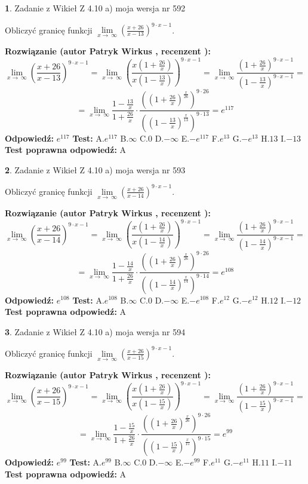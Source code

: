 \documentclass[12pt, a4paper]{article}
\theoremstyle{definition} %
\newtheorem{zad}{}
\newcommand{\zadStart}[1]{\begin{zad}#1\newline}
\newcommand{\zadStop}{\end{zad}}
\newcommand{\rozwStart}[2]{\noindent \textbf{Rozwiązanie (autor #1 , recenzent #2): }\newline}
\newcommand{\rozwStop}{\newline}
\newcommand{\odpStart}{\noindent \textbf{Odpowiedź:}\newline}
\newcommand{\odpStop}{\newline}
\newcommand{\testStart}{\noindent \textbf{Test:}\newline}
\newcommand{\testStop}{\newline}
\newcommand{\kluczStart}{\noindent \textbf{Test poprawna odpowiedź:}\newline}
\newcommand{\kluczStop}{\newline}
\begin{document}
\zadStart{Zadanie z Wikieł Z 4.10 a) moja wersja nr 592}

Obliczyć granicę funkcji  $\lim\limits_{x\to\ \infty}(\frac{x+26}{x-13})^{9\cdot x-1}$.
\zadStop
\rozwStart{Patryk Wirkus}{}
$$\lim\limits_{x\to\ \infty}(\frac{x+26}{x-13})^{9\cdot x-1} = \lim\limits_{x\to\ \infty}(\frac{x(1+\frac{26}{x})}{x(1-\frac{13}{x})})^{9\cdot x-1}=\lim\limits_{x\to\ \infty}\frac{(1+\frac{26}{x})^{9\cdot x-1}}{(1-\frac{13}{x})^{9\cdot x-1}}=$$
$$=\lim\limits_{x\to\ \infty}\frac{1-\frac{13}{x}}{1+\frac{26}{x}}\cdot\frac{((1+\frac{26}{x})^{\frac{x}{26}})^{9\cdot26}}{((1-\frac{13}{x})^{\frac{x}{13}})^{9\cdot13}}=e^{117}$$
\rozwStop
\odpStart
$e^{117}$
\odpStop
\testStart
A.$e^{117}$ B.$\infty$ C.$0$ D.$-\infty$ E.$-e^{117}$
F.$e^{13}$ G.$-e^{13}$
H.$13$
I.$-13$
\testStop
\kluczStart
A
\kluczStop



\zadStart{Zadanie z Wikieł Z 4.10 a) moja wersja nr 593}

Obliczyć granicę funkcji  $\lim\limits_{x\to\ \infty}(\frac{x+26}{x-14})^{9\cdot x-1}$.
\zadStop
\rozwStart{Patryk Wirkus}{}
$$\lim\limits_{x\to\ \infty}(\frac{x+26}{x-14})^{9\cdot x-1} = \lim\limits_{x\to\ \infty}(\frac{x(1+\frac{26}{x})}{x(1-\frac{14}{x})})^{9\cdot x-1}=\lim\limits_{x\to\ \infty}\frac{(1+\frac{26}{x})^{9\cdot x-1}}{(1-\frac{14}{x})^{9\cdot x-1}}=$$
$$=\lim\limits_{x\to\ \infty}\frac{1-\frac{14}{x}}{1+\frac{26}{x}}\cdot\frac{((1+\frac{26}{x})^{\frac{x}{26}})^{9\cdot26}}{((1-\frac{14}{x})^{\frac{x}{14}})^{9\cdot14}}=e^{108}$$
\rozwStop
\odpStart
$e^{108}$
\odpStop
\testStart
A.$e^{108}$ B.$\infty$ C.$0$ D.$-\infty$ E.$-e^{108}$
F.$e^{12}$ G.$-e^{12}$
H.$12$
I.$-12$
\testStop
\kluczStart
A
\kluczStop



\zadStart{Zadanie z Wikieł Z 4.10 a) moja wersja nr 594}

Obliczyć granicę funkcji  $\lim\limits_{x\to\ \infty}(\frac{x+26}{x-15})^{9\cdot x-1}$.
\zadStop
\rozwStart{Patryk Wirkus}{}
$$\lim\limits_{x\to\ \infty}(\frac{x+26}{x-15})^{9\cdot x-1} = \lim\limits_{x\to\ \infty}(\frac{x(1+\frac{26}{x})}{x(1-\frac{15}{x})})^{9\cdot x-1}=\lim\limits_{x\to\ \infty}\frac{(1+\frac{26}{x})^{9\cdot x-1}}{(1-\frac{15}{x})^{9\cdot x-1}}=$$
$$=\lim\limits_{x\to\ \infty}\frac{1-\frac{15}{x}}{1+\frac{26}{x}}\cdot\frac{((1+\frac{26}{x})^{\frac{x}{26}})^{9\cdot26}}{((1-\frac{15}{x})^{\frac{x}{15}})^{9\cdot15}}=e^{99}$$
\rozwStop
\odpStart
$e^{99}$
\odpStop
\testStart
A.$e^{99}$ B.$\infty$ C.$0$ D.$-\infty$ E.$-e^{99}$
F.$e^{11}$ G.$-e^{11}$
H.$11$
I.$-11$
\testStop
\kluczStart
A
\kluczStop
\end{document}
